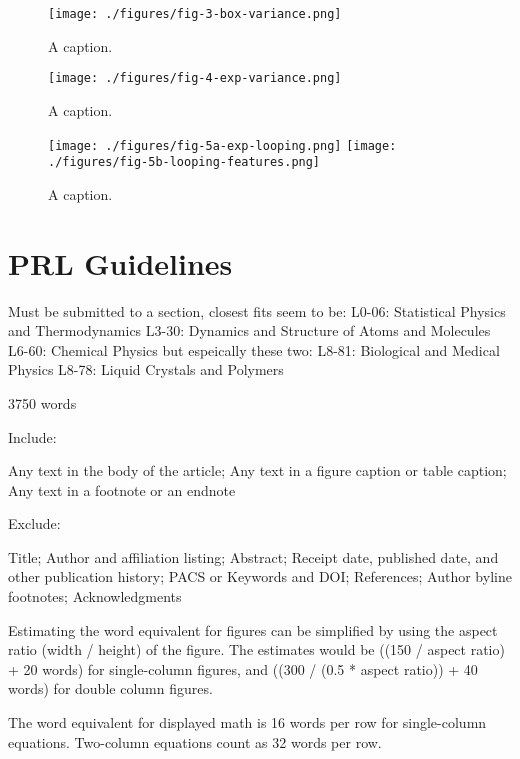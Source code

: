 \documentclass[%
 reprint,
superscriptaddress,
showpacs,preprintnumbers,
 amsmath,amssymb,
 aps,
 prl,
]{revtex4-1}
\begin{document}
\begin{figure}[t]
    \centering
    \texttt{[image: ./figures/fig-3-box-variance.png]}
    \caption{A caption.}
\end{figure}
\begin{figure}[t]
    \centering
    \texttt{[image: ./figures/fig-4-exp-variance.png]}
    \caption{A caption.}
\end{figure}
\begin{figure}[t]
    \centering
    \texttt{[image: ./figures/fig-5a-exp-looping.png]}
    \texttt{[image: ./figures/fig-5b-looping-features.png]}
    \caption{A caption.}
\end{figure}

\section{PRL Guidelines}

Must be submitted to a section, closest fits seem to be:
L0-06: Statistical Physics and Thermodynamics
L3-30: Dynamics and Structure of Atoms and Molecules
L6-60: Chemical Physics
but espeically these two:
L8-81: Biological and Medical Physics
L8-78: Liquid Crystals and Polymers


3750 words

Include:

Any text in the body of the article;
Any text in a figure caption or table caption;
Any text in a footnote or an endnote

Exclude:

Title;
Author and affiliation listing;
Abstract;
Receipt date, published date, and other publication history;
PACS or Keywords and DOI;\@
References;
Author byline footnotes;
Acknowledgments

Estimating the word equivalent for figures can be simplified by using the aspect
ratio (width / height) of the figure. The estimates would be ((150 / aspect
ratio) + 20 words) for single-column figures, and ((300 / (0.5 * aspect ratio))
+ 40 words) for double column figures.

The word equivalent for displayed math is 16 words per row for single-column
equations. Two-column equations count as 32 words per row.

\end{document}
